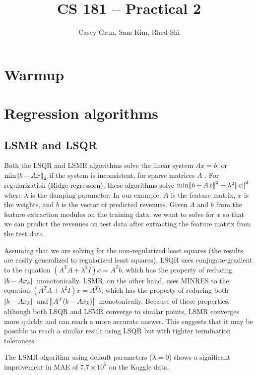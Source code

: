 \documentclass[11pt]{amsart}
\title{CS 181 -- Practical 2}
\author{Casey Grun, Sam Kim, Rhed Shi}
\begin{document}
\maketitle

\section{Warmup}

\section{Regression algorithms}

\subsection{LSMR and LSQR}

Both the LSQR and LSMR algorithms solve the linear system $Ax=b$, or $\text{min}\norm{b-Ax}_2$ if the system is inconsistent, for sparse matrices $A$ \cite{LSMR}. For regularization (Ridge regression), these algorithms solve $\text{min}\norm{b-Ax}^2+\lambda^2\norm{x}^2$ where $\lambda$ is the damping parameter. In our example, $A$ is the feature matrix, $x$ is the weights, and $b$ is the vector of predicted revenues. Given $A$ and $b$ from the feature extraction modules on the training data, we want to solve for $x$ so that we can predict the revenues on test data after extracting the feature matrix from the test data.

Assuming that we are solving for the non-regularized least squares (the results are easily generalized to regularized least squares), LSQR uses conjugate-gradient to the equation $(A^TA+\lambda^2I)x=A^Tb$, which has the property of reducing $\norm{b-Ax_k}$ monotonically. LSMR, on the other hand, uses MINRES to the equation $(A^TA+\lambda^2I)x=A^Tb$, which has the property of reducing both $\norm{b-Ax_k}$ and $\norm{A^T(b-Ax_k)}$ monotonically. Because of these properties, although both LSQR and LSMR converge to similar points, LSMR converges more quickly and can reach a more accurate answer. This suggests that it may be possible to reach a similar result using LSQR but with tighter termination tolerances.

The LSMR algorithm using default parameters ($\lambda=0$) shows a significant improvement in MAE of $7.7\times10^5$ on the Kaggle data.
\end{document}

